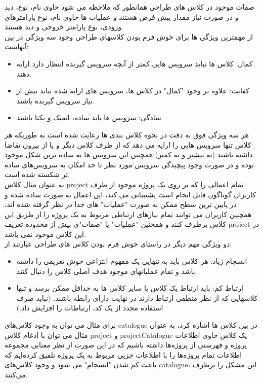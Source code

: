 صفات موجود در کلاس های طراحی همانطور که ملاحظه می شود حاوی نام، نوع، دید و در صورت نیاز مقدار پیش فرض هستند و عملیات ها حاوی نام، نوع پارامترهای ورودی، نوع پارامتر خروجی و دید هستند.\\
از مهمترین ویژگی ها برای خوش فرم بودن کلاسهای طراحی وجود سه ویژگی در بین آنهاست:\\
\begin{itemize}
\item
کمال: کلاس ها نباید سرویس هایی کمتر از آنچه سرویس گیرنده انتظار دارد ارایه دهند.
\item
کفایت: علاوه بر وجود "کمال" در کلاس ها، سرویس های ارایه شده نباید بیش از نیاز سرویس گیرنده باشند.
\item
سادگی: سرویس ها باید ساده، اتمیک و یکتا باشند.
\end{itemize}
هر سه ویژگی فوق به دقت در نحوه کلاس بندی ها رعایت شده است به طوریکه هر کلاس تنها سرویس هایی را ارایه می دهد که از طرف کلاس دیگر و یا از بیرون تقاضا داشته باشند (نه بیشتر و نه کمتر) همچنین این سرویس ها به ساده ترین شکل موجود بوده و در صورت وجود پیچیدگی سرویس مورد نظر تا حد امکان به سرویس‌های ساده تر شکسته شده است.\\
به عنوان مثال کلاس project تمام اعمالی را که بر روی یک پروژه موجود از طرف کاربران گوناگون قابل انجام است پشتیبانی می کند، این اعمال به صورت ساده شده و در پایین ترین سطح ممکن به صورت "عملیات" های جدا در نظر گرفته شده اند، همچنین کاربران می توانند تمام نیازهای ارتباطی مربوط به یک پروژه را از طریق این کلاس برطرف کنند و همچنین "عملیات" یا "صفات"ی بیش از محدوده تعریف project در این کلاس موجود نمی باشد.\\
دو ویژگی مهم دیگر در راستای خوش فرم بودن کلاس های طراحی عبارتند از:\\
\begin{itemize}
\item
انسجام زیاد: هر کلاس باید به تنهایی یک مفهوم انتزاعی خوش تعریفی را داشته باشد و تمام عملیاتهای موجود هدف اصلی کلاس را دنبال کنند.
\item
ارتباط کم: باید ارتباط یک کلاس با سایر کلاس ها به حداقل ممکن برسد و تنها کلاسهایی که از نظر منطقی ارتباط دارند در نهایت دارای رابطه باشند. (نباید صرف استفاده مجدد از یک کد، ارتباطات را افزایش داد.)
\end{itemize}
برای مثال می توان به وجود کلاس‌های catalogue در بین کلاس ها اشاره کرد، به عنوان مثال می توان با ادغام کلاس project و projectCatalogue یک کلاس حاوی اطلاعات پروژه و فهرستی از پروژه‌ها داشته باشیم که در این صورت از نظر معنایی مجموعه اطلاعات تمام پروژه‌ها را با اطلاعات جزیی مربوط به یک پروژه تلفیق کرده‌ایم که باعث کم شدن "انسجام" می شود و وجود کلاس‌های catalogue، این مشکل را برطرف می‌کنند.
